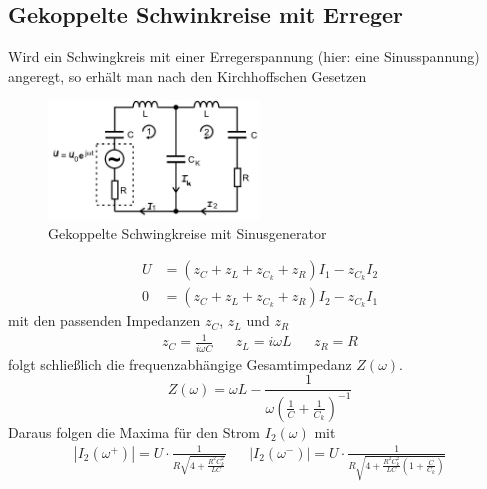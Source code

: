 \subsection{Gekoppelte Schwinkreise mit Erreger}
Wird ein Schwingkreis mit einer Erregerspannung (hier: eine Sinusspannung) angeregt,
so erhält man nach den Kirchhoffschen Gesetzen
\begin{figure}[H]
    \centering
    \includegraphics[width=0.5\textwidth]{bilder/schwingkreis_sinus.jpg}
    \caption{Gekoppelte Schwingkreise mit Sinusgenerator \cite[303]{Anleitung}}
\end{figure} 
\begin{align}
    U&=\left(z_C+z_L+z_{C_k}+z_R\right)I_1-z_{C_k}I_2 \label{schw1}\\
    0&=\left(z_C+z_L+z_{C_k}+z_R\right)I_2-z_{C_k}I_1 \label{schw2}
\end{align}
mit den passenden Impedanzen $z_C$, $z_L$ und $z_R$
\begin{align*}
    z_C=\frac{1}{i\omega C}&
    &z_L=i \omega L&
    &z_R=R
\end{align*}
folgt schließlich die frequenzabhängige Gesamtimpedanz $Z\left(\omega\right)$.
\begin{equation}
    Z\left(\omega\right)=\omega L -\frac{1}{\omega\left(\frac{1}{C}+\frac{1}{C_k}\right)^{-1}}
\end{equation}
Daraus folgen die Maxima für den Strom $I_2\left(\omega\right)$ mit
\begin{align}
    |I_2(\omega^+)|=U\cdot\frac{1}{R\sqrt{4+\frac{R^2C_k^2}{LC}}}&&
    |I_2(\omega^-)|=U\cdot\frac{1}{R\sqrt{4+\frac{R^2C_k^2}{LC}(1+\frac{C}{C_k})}}
\end{align}

\label{sec:theorie}